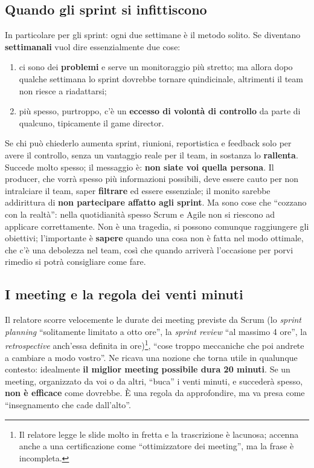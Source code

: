 \subsection{Quando gli sprint si infittiscono}

In particolare per gli sprint: ogni due settimane è il metodo solito. Se
diventano \textbf{settimanali} vuol dire essenzialmente due cose:
\begin{enumerate}
  \item ci sono dei \textbf{problemi} e serve un monitoraggio più stretto; ma
        allora dopo qualche settimana lo sprint dovrebbe tornare quindicinale,
        altrimenti il team non riesce a riadattarsi;
  \item più spesso, purtroppo, c'è un \textbf{eccesso di volontà di controllo}
        da parte di qualcuno, tipicamente il game director.
\end{enumerate}
Se chi può chiederlo aumenta sprint, riunioni, reportistica e feedback solo per
avere il controllo, senza un vantaggio reale per il team, in sostanza lo
\textbf{rallenta}. Succede molto spesso; il messaggio è: \textbf{non siate voi
quella persona}. Il producer, che vorrà spesso più informazioni possibili, deve
essere cauto per non intralciare il team, saper \textbf{filtrare} ed essere
essenziale; il monito sarebbe addirittura di \textbf{non partecipare affatto agli
sprint}. Ma sono cose che ``cozzano con la realtà'': nella quotidianità spesso
Scrum e Agile non si riescono ad applicare correttamente. Non è una tragedia, si
possono comunque raggiungere gli obiettivi; l'importante è \textbf{sapere} quando
una cosa non è fatta nel modo ottimale, che c'è una debolezza nel team, così che
quando arriverà l'occasione per porvi rimedio si potrà consigliare come fare.

\subsection{I meeting e la regola dei venti minuti}

Il relatore scorre velocemente le durate dei meeting previste da Scrum (lo
\emph{sprint planning} ``solitamente limitato a otto ore'', la \emph{sprint
review} ``al massimo 4 ore'', la \emph{retrospective} anch'essa definita in
ore)\footnote{Il relatore legge le slide molto in fretta e la trascrizione è
lacunosa; accenna anche a una certificazione come ``ottimizzatore dei
meeting'', ma la frase è incompleta.}, ``cose troppo meccaniche che poi andrete
a cambiare a modo vostro''. Ne ricava una nozione che torna utile in qualunque
contesto: idealmente \textbf{il miglior meeting possibile dura 20 minuti}. Se un
meeting, organizzato da voi o da altri, ``buca'' i venti minuti, e succederà
spesso, \textbf{non è efficace} come dovrebbe. È una regola da approfondire, ma
va presa come ``insegnamento che cade dall'alto''.

